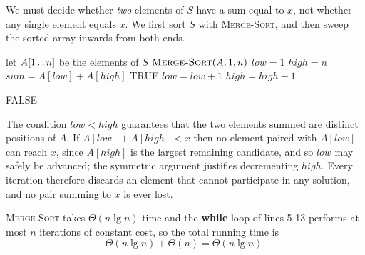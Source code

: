 We must decide whether \emph{two} elements of $S$ have a sum equal to $x$, not
whether any single element equals $x$. We first sort $S$ with
\textsc{Merge-Sort}, and then sweep the sorted array inwards from both ends.

\begin{algorithmic}[1]
  \STATE let $A[1 \mathinner{{\ldotp}\,{\ldotp}} n]$ be the elements of $S$
  \STATE $\textsc{Merge-Sort}(A, 1, n)$
  \STATE $\mathit{low} = 1$
  \STATE $\mathit{high} = n$
  \STATE $\mathit{sum} = A[\mathit{low}] + A[\mathit{high}]$
  \RETURN \textrm{TRUE}
  \STATE $\mathit{low} = \mathit{low} + 1$
  \ELSE
  \STATE $\mathit{high} = \mathit{high} - 1$
  \ENDIF
  \ENDWHILE

  \RETURN \textrm{FALSE}
\end{algorithmic}

The condition $\mathit{low} < \mathit{high}$ guarantees that the two elements
summed are distinct positions of $A$. If $A[\mathit{low}] + A[\mathit{high}] <
x$ then no element paired with $A[\mathit{low}]$ can reach $x$, since
$A[\mathit{high}]$ is the largest remaining candidate, and so $\mathit{low}$ may
safely be advanced; the symmetric argument justifies decrementing
$\mathit{high}$. Every iteration therefore discards an element that cannot
participate in any solution, and no pair summing to $x$ is ever lost.

\textsc{Merge-Sort} takes $\Theta(n\lg{n})$ time and the \textbf{while} loop of
lines 5-13 performs at most $n$ iterations of constant cost, so the total
running time is
\[
  \Theta(n\lg{n}) + \Theta(n) = \Theta(n\lg{n}).
\]
